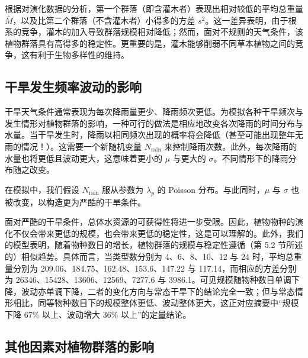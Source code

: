 \documentclass[11pt,a4paper]{ctexart}
\begin{document}
根据对演化数据的分析，第一个群落（即含灌木者）表现出相对较低的平均总重量 $\bar M$，以及比第二个群落（不含灌木者）小得多的方差 $s^{2}$。这一差异表明，由于根系的竞争，灌木的加入导致群落规模相对降低；然而，面对不规则的天气条件，该植物群落具有高得多的稳定性。更重要的是，灌木能够削弱不同草本植物之间的竞争，这有利于生物多样性的维持。

\subsection{干旱发生频率波动的影响}

干旱天气条件通常表现为每次降雨量更少、降雨频次更低。为模拟各种干旱频次与发生情形对植物群落的影响，一种可行的做法是相应地改变各次降雨的时间分布与水量。当干旱发生时，降雨以相同频次出现的概率将会降低（甚至可能出现整年无雨的情况！）。这需要一个新随机变量 $N_{\mathrm{rain}}$ 来控制降雨次数。此外，每次降雨的水量也将更低且波动更大，这意味着更小的 $\mu$ 与更大的 $\sigma$。不同情形下的降雨分布随之改变。

在模拟中，我们假设 $N_{\mathrm{rain}}$ 服从参数为 $\lambda_p$ 的 Poisson 分布。与此同时，$\mu$ 与 $\sigma$ 也被改变，以构造更为严酷的干旱条件。

面对严酷的干旱条件，总体水资源的可获得性将进一步受限。因此，植物物种的演化不仅会带来更低的规模，也会带来更低的稳定性，这是可以理解的。此外，我们的模型表明，随着物种数目的增长，植物群落的规模与稳定性遵循（第 5.2 节所述的）相似趋势。具体而言，当类型数分别为 4、6、8、10、12 与 24 时，平均总重量分别为 209.06、184.75、162.48、153.6、147.22 与 117.14，而相应的方差分别为 26346、15428、13606、12569、7277.6 与 3986.1。可见规模随物种数目单调下降，波动亦单调下降，二者的变化方向与常态干旱下的结论完全一致；但与常态情形相比，同等物种数目下的规模整体更低、波动整体更大，这正对应摘要中“规模下降 67\% 以上、波动增大 36\% 以上”的定量结论。

\subsection{其他因素对植物群落的影响}
\end{document}

